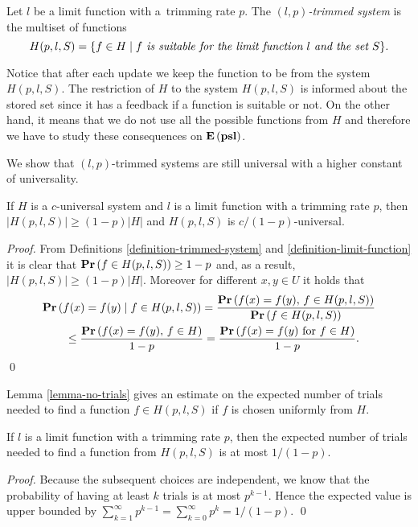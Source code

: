 \begin{definition}
\label{definition-trimmed-system}
Let $l$ be a limit function with a~trimming rate $p$.
The \emph{$(l, p)$-trimmed system} is the multiset of functions \[ H(p, l, S) = \{ f \in H \mid f \textit{ is suitable for the limit function $l$ and the set $S$} \}. \]
\end{definition}

Notice that after each update we keep the function to be from the system $H(p, l, S)$.
The restriction of $H$ to the system $H(p, l, S)$ is informed about the stored set since it has a feedback if a function is suitable or not.
On the other hand, it means that we do not use all the possible functions from $H$ and therefore we have to study these consequences on $\mathbf{E}\left(\mathbf{psl}\right)$.

We show that $(l, p)$-trimmed systems are still universal with a higher constant of universality.
\begin{lemma}
\label{lemma-trimmed-system}
If $H$ is a $c$-universal system and $l$ is a limit function with a trimming rate $p$, then $|H(p, l, S)| \geq (1 - p)|H|$ and $H(p, l, S)$ is $c/(1 - p)$-universal.
\end{lemma}
\begin{proof}
From Definitions \ref{definition-trimmed-system} and \ref{definition-limit-function} it is clear that $\mathbf{Pr}\left(f \in H(p, l, S)\right) \geq 1 - p$ and, as a result, $|H(p, l, S)| \geq (1 - p)|H|$.
Moreover for different $x, y \in U$ it holds that
\[
\begin{split}
& \mathbf{Pr}\left(f(x) = f(y) \mid f \in H(p, l, S)\right) 
	= \frac{\mathbf{Pr}\left(f(x) = f(y),\, f \in H(p, l, S)\right)}{\mathbf{Pr}\left(f \in H(p, l, S)\right)} \\
	& \qquad \leq \frac{\mathbf{Pr}\left(f(x) = f(y),\, f \in H\right)}{1 - p} = \frac{\mathbf{Pr}\left(f(x) = f(y) \mbox{ for } f \in H\right)}{1 - p}. \\
\end{split}
\]
\qed
\end{proof}

Lemma \ref{lemma-no-trials} gives an estimate on the expected number of trials needed to find a function $f \in H(p, l, S)$ if $f$ is chosen uniformly from $H$.
\begin{lemma}
\label{lemma-no-trials}
If $l$ is a limit function with a trimming rate $p$, then the expected number of trials needed to find a function from $H(p, l, S)$ is at most ${1}/{(1 - p)}$.
\end{lemma}
\begin{proof}
Because the subsequent choices are independent, we know that the probability of having at least $k$ trials is at most $p^{k - 1}$. 
Hence the expected value is upper bounded by $\sum_{k = 1}^{\infty} p^{k - 1} = \sum_{k = 0}^{\infty} p^k = {1}/{(1 - p)}.$
\qed
\end{proof}

